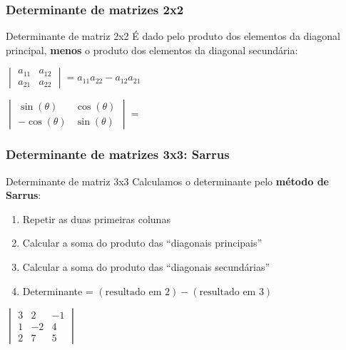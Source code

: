 \documentclass[pdftex, brazil, aspectratio=169]{beamer}
\begin{document}
\begin{frame}[t]
  \frametitle{Determinante de matrizes 2x2}
  \begin{block}{Determinante de matriz 2x2}
    É dado pelo produto dos elementos da diagonal principal, \textbf{menos} o
    produto dos elementos da diagonal secundária:
    \begin{center}
    $\begin{vmatrix}
      a_{11} & a_{12}\\
      a_{21} & a_{22}\end{vmatrix} = a_{11}a_{22} - a_{12}a_{21}$
    \end{center}
  \end{block}
  $\begin{vmatrix}
    \sin{(\theta)} & \cos{(\theta)}\\
    -\cos{(\theta)} & \sin{(\theta)}\end{vmatrix} =$
\end{frame}

\begin{frame}[t]
  \frametitle{Determinante de matrizes 3x3: Sarrus}
  \begin{block}{Determinante de matriz 3x3}
    Calculamos o determinante pelo \textbf{método de Sarrus}:
    \begin{enumerate}
      \item Repetir as duas primeiras colunas
      \item Calcular a soma do produto das ``diagonais principais''
      \item Calcular a soma do produto das ``diagonais secundárias''
      \item Determinante = $(\text{resultado em } 2) - (\text{resultado em } 3)$
    \end{enumerate}
  \end{block}
  $\begin{vmatrix}
    3 & 2 & -1\\
    1 & -2 & 4\\
    2 & 7 & 5\end{vmatrix}$
\end{frame}
\end{document}
